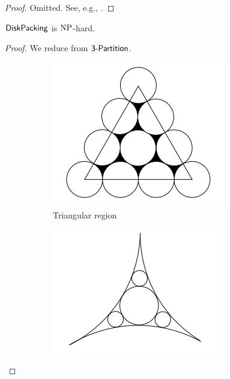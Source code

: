 \begin{proof}
  Omitted. See, e.g., \cite{garey-johnson}.
\end{proof}

\begin{theorem}
  \label{packing-hard}
  $\mathsf{DiskPacking}$ is $\mathrm{NP}$-hard.
\end{theorem}

\begin{proof}
  We reduce from $\mathsf{3\text{-} Partition}$.
  \begin{figure}[h!tbp]
    \centering
    \begin{subfigure}{.35\textwidth}
      \includegraphics[width=\textwidth]{origami-data/triangle-pockets}
      \caption{Triangular region}
      \label{triangle}
    \end{subfigure}
    \begin{subfigure}{.35\textwidth}
      \includegraphics[width=\textwidth]{origami-data/pocket}

\end{subfigure}
\end{figure}
\end{proof}
